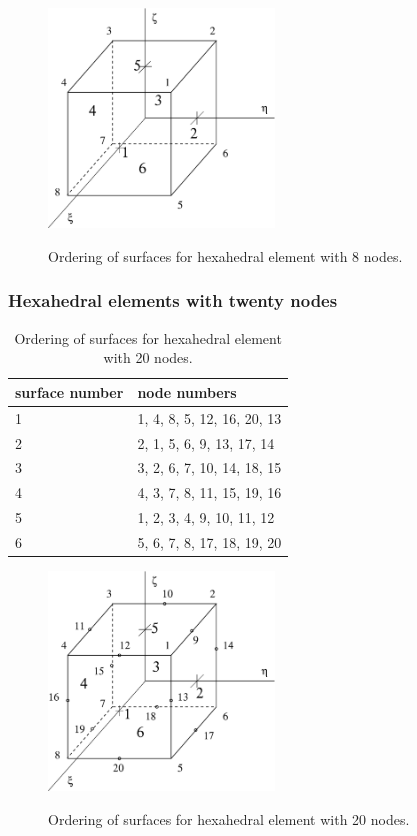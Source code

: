 \begin{figure}[h]
\begin{center}
\includegraphics[width=60mm]{FIG/linhexsurf.eps}
\label{figlinhexsurf}
\caption{Ordering of surfaces for hexahedral element with 8 nodes.}
\end{center}
\end{figure}

\subsubsection{Hexahedral elements with twenty nodes}

\begin{table}[h]
\begin{center}
\begin{tabular}{|l|l|}
\hline
surface number & node numbers
\\ \hline
1 & 1, 4, 8, 5, 12, 16, 20, 13
\\ \hline
2 & 2, 1, 5, 6, 9, 13, 17, 14
\\ \hline
3 & 3, 2, 6, 7, 10, 14, 18, 15
\\ \hline
4 & 4, 3, 7, 8, 11, 15, 19, 16
\\ \hline
5 & 1, 2, 3, 4, 9, 10, 11, 12
\\ \hline
6 & 5, 6, 7, 8, 17, 18, 19, 20
\\ \hline
\end{tabular}
\label{tabquadhexsurf}
\caption{Ordering of surfaces for hexahedral element with 20 nodes.}
\end{center}
\end{table}

\begin{figure}[h]
\begin{center}
\includegraphics[width=60mm]{FIG/quadhexsurf.eps}
\label{figquadhexsurf}
\caption{Ordering of surfaces for hexahedral element with 20 nodes.}
\end{center}
\end{figure}
